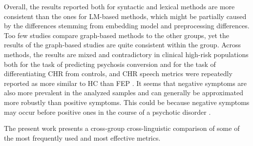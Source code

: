 





Overall, the results reported both for syntactic and lexical methods are more consistent than the ones for LM-based methods, which might be partially caused by the differences stemming from embedding model and preprocessing differences. Too few studies compare graph-based methods to the other groups, yet the results of the graph-based studies are quite consistent within the group. Across methods, the results are mixed and contradictory in clinical high-risk populations both for the task of predicting psychosis conversion and for the task of differentiating CHR from controls, and CHR speech metrics were repeatedly reported as more similar to HC than FEP \citep{morgan2021natural, srivastava2022p473, nettekoven2023semantic}. It seems that negative symptoms are also more prevalent in the analyzed samples and can generally be approximated more robustly than positive symptoms. This could be because negative symptoms may occur before positive ones in the course of a psychotic disorder \citep{just2023validation}.


The present work presents a cross-group cross-linguistic comparison of some of the most frequently used and most effective metrics. 
